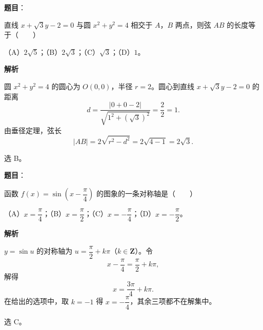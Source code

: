 \begin{answer}

\textbf{题目}：

直线 $x+\sqrt3y-2=0$ 与圆 $x^2+y^2=4$ 相交于 $A$，$B$ 两点，则弦 $AB$ 的长度等于\mbox{（　　）}

（A）$2\sqrt5$；（B）$2\sqrt3$；（C）$\sqrt3$；（D）$1$。

\textbf{解析}

圆 $x^2+y^2=4$ 的圆心为 $O(0,0)$，半径 $r=2$。圆心到直线 $x+\sqrt3y-2=0$ 的距离
\nopagebreak[4]
\[d=\frac{|0+0-2|}{\sqrt{1^2+(\sqrt3)^2}}=\frac{2}{2}=1.\]
由垂径定理，弦长
\nopagebreak[4]
\[|AB|=2\sqrt{r^2-d^2}=2\sqrt{4-1}=2\sqrt3.\]

选 B。


\end{answer}
\begin{answer}

\textbf{题目}：

函数 $f(x)=\sin\left(x-\dfrac\pi4\right)$ 的图象的一条对称轴是\mbox{（　　）}

（A）$x=\dfrac\pi4$；（B）$x=\dfrac\pi2$；（C）$x=-\dfrac\pi4$；（D）$x=-\dfrac\pi2$。

\textbf{解析}

$y=\sin u$ 的对称轴为 $u=\dfrac\pi2+k\pi$（$k\in\mathbf Z$）。令
\nopagebreak[4]
\[x-\frac\pi4=\frac\pi2+k\pi,\]
解得
\nopagebreak[4]
\[x=\frac{3\pi}{4}+k\pi.\]
在给出的选项中，取 $k=-1$ 得 $x=-\dfrac\pi4$，其余三项都不在解集中。

选 C。


\end{answer}

